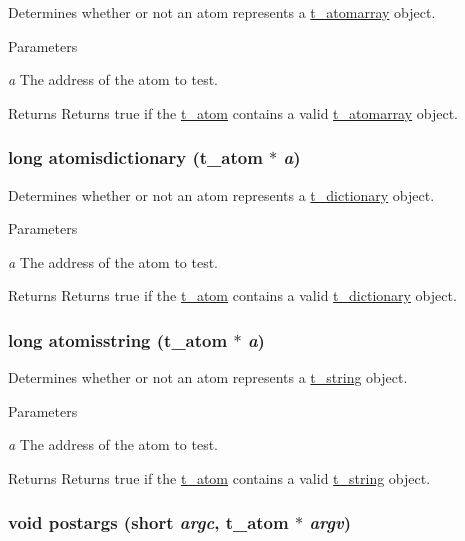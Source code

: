 Determines whether or not an atom represents a \hyperlink{structt__atomarray}{t\_\-atomarray} object. 
\begin{DoxyParams}{Parameters}
\item[{\em a}]The address of the atom to test. \end{DoxyParams}
\begin{DoxyReturn}{Returns}
Returns true if the \hyperlink{structt__atom}{t\_\-atom} contains a valid \hyperlink{structt__atomarray}{t\_\-atomarray} object. 
\end{DoxyReturn}
\hypertarget{group__atom_ga85a30af9d861ac3f5664e63c4772e77b}{
\subsubsection[{atomisdictionary}]{\setlength{\rightskip}{0pt plus 5cm}long atomisdictionary ({\bf t\_\-atom} $\ast$ {\em a})}}
\label{group__atom_ga85a30af9d861ac3f5664e63c4772e77b}


Determines whether or not an atom represents a \hyperlink{structt__dictionary}{t\_\-dictionary} object. 
\begin{DoxyParams}{Parameters}
\item[{\em a}]The address of the atom to test. \end{DoxyParams}
\begin{DoxyReturn}{Returns}
Returns true if the \hyperlink{structt__atom}{t\_\-atom} contains a valid \hyperlink{structt__dictionary}{t\_\-dictionary} object. 
\end{DoxyReturn}
\hypertarget{group__atom_gaf09b95edeae2bf9704641e032d213954}{
\subsubsection[{atomisstring}]{\setlength{\rightskip}{0pt plus 5cm}long atomisstring ({\bf t\_\-atom} $\ast$ {\em a})}}
\label{group__atom_gaf09b95edeae2bf9704641e032d213954}


Determines whether or not an atom represents a \hyperlink{structt__string}{t\_\-string} object. 
\begin{DoxyParams}{Parameters}
\item[{\em a}]The address of the atom to test. \end{DoxyParams}
\begin{DoxyReturn}{Returns}
Returns true if the \hyperlink{structt__atom}{t\_\-atom} contains a valid \hyperlink{structt__string}{t\_\-string} object. 
\end{DoxyReturn}
\hypertarget{group__atom_ga827d5fa3550123db43e1121fea79db1b}{
\subsubsection[{postargs}]{\setlength{\rightskip}{0pt plus 5cm}void postargs (short {\em argc}, \/  {\bf t\_\-atom} $\ast$ {\em argv})}}
\label{group__atom_ga827d5fa3550123db43e1121fea79db1b}


